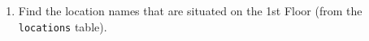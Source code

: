 \documentclass[12pt,a4paper]{article}
\begin{document}
\begin{enumerate}



    \item Find the location names that are situated on the 1st Floor (from the \texttt{locations} table).







\end{enumerate}
\end{document}
